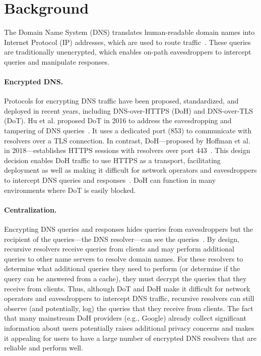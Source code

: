 \section{Background}\label{sec:background}

The Domain Name System (DNS) translates human-readable domain names into
Internet Protocol (IP) addresses, which are used to route
traffic~\cite{dns-rfcs}.  These queries are traditionally unencrypted, which
enables on-path eavesdroppers to intercept queries and manipulate responses.

\paragraph{Encrypted DNS.}
Protocols for encrypting DNS traffic have been proposed, standardized, and
deployed in recent years, including DNS-over-HTTPS (DoH) and DNS-over-TLS
(DoT).  Hu et al. proposed DoT in 2016 to address the eavesdropping and
tampering of DNS queries~\cite{hu2016DoT}.  It uses a dedicated port (853)
to communicate with resolvers over a TLS connection.  In contrast,
DoH---proposed by Hoffman et al. in 2018---establishes HTTPS sessions with
resolvers over port 443~\cite{hoffman2018DoH}.  This design decision enables
DoH traffic to use HTTPS as a transport, facilitating deployment as well as
making it difficult for network operators and eavesdroppers to intercept DNS
queries and responses~\cite{boettger2019empirical}. DoH can function in many
environments where DoT is easily blocked.

\paragraph{Centralization.}
Encrypting DNS queries and responses hides queries from eavesdroppers but the
recipient of the queries---the DNS resolver---can see the
queries~\cite{IEEEfight}. By design, recursive resolvers receive queries from
clients and may perform additional queries to other name servers to resolve
domain names.  For these resolvers to determine what additional
queries they need to perform (or determine if the query can be answered from a
cache), they must decrypt the queries that they receive from clients.  Thus,
although DoT and DoH make it difficult for network operators and eavesdroppers
to intercept DNS traffic, recursive resolvers can still
observe (and potentially, log) the queries that they receive from clients.
The fact that many mainstream DoH providers (e.g., Google) already collect
significant information about users potentially raises additional privacy
concerns and makes it appealing for users to have a large number of encrypted
DNS resolvers that are reliable and perform well.

